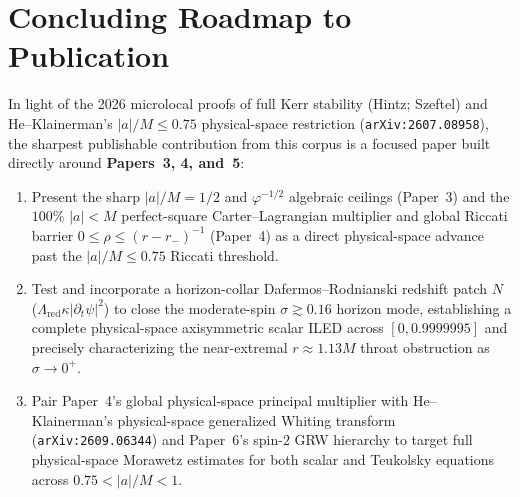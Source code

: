 \documentclass[11pt, a4paper]{article}
\theoremstyle{remark}
\begin{document}
\section{Concluding Roadmap to Publication}

In light of the 2026 microlocal proofs of full Kerr stability (Hintz; Szeftel) and He--Klainerman's $|a|/M \le 0.75$ physical-space restriction (\texttt{arXiv:2607.08958}), the sharpest publishable contribution from this corpus is a focused paper built directly around \textbf{Papers~3, 4, and~5}:
\begin{enumerate}
\item Present the sharp $|a|/M = 1/2$ and $\varphi^{-1/2}$ algebraic ceilings (Paper~3) and the $100\%$ $|a| < M$ perfect-square Carter--Lagrangian multiplier and global Riccati barrier $0 \le \rho \le (r - r_-)^{-1}$ (Paper~4) as a direct physical-space advance past the $|a|/M \le 0.75$ Riccati threshold.
\item Test and incorporate a horizon-collar Dafermos--Rodnianski redshift patch $N$ ($\Lambda_{\mathrm{red}}\kappa|\partial_t\psi|^2$) to close the moderate-spin $\sigma \gtrsim 0.16$ horizon mode, establishing a complete physical-space axisymmetric scalar ILED across $[0, 0.9999995]$ and precisely characterizing the near-extremal $r \approx 1.13M$ throat obstruction as $\sigma \to 0^+$.
\item Pair Paper~4's global physical-space principal multiplier with He--Klainerman's physical-space generalized Whiting transform (\texttt{arXiv:2609.06344}) and Paper~6's spin-$2$ GRW hierarchy to target full physical-space Morawetz estimates for both scalar and Teukolsky equations across $0.75 < |a|/M < 1$.
\end{enumerate}
\end{document}
